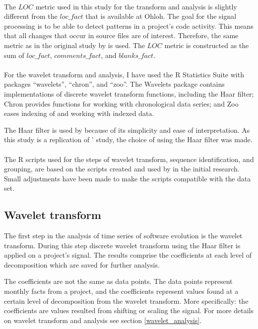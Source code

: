 \paragraph{}
The $LOC$ metric used in this study for the transform and analysis is slightly
different from the $loc\_fact$ that is available at Ohloh. The goal for the
signal processing is to be able to detect patterns in a project's code
activity. This means that all changes that occur in source files are of
interest. Therefore, the same metric as in the original study by
\citet{karus2013} is used. The $LOC$ metric is constructed as the sum of
$loc\_fact$, $comments\_fact$, and $blanks\_fact$.

\paragraph{}
For the wavelet transform and analysis, I have used the R Statistics Suite
with packages ``wavelets'', ``chron'', and ``zoo''. The Wavelets package
contains implementations of discrete wavelet transform functions, including
the Haar filter; Chron provides functions for working with chronological data
series; and Zoo eases indexing of and working with indexed data.

The Haar filter is used by \citet{karus2013} because of its simplicity and ease
of interpretation. As this study is a replication of \citeauthor{karus2013}'
study, the choice of using the Haar filter was made.

\paragraph{}
The R scripts used for the steps of wavelet transform, sequence identification,
and grouping, are based on the scripts created and used by
\citeauthor{karus2013} in the initial research. Small adjustments have been
made to make the scripts compatible with the data set.

\subsection{Wavelet transform}
The first step in the analysis of time series of software evolution is the
wavelet transform. During this step discrete wavelet transform using the Haar
filter is applied on a project's signal. The results comprise the
coefficients at each level of decomposition which are saved for further
analysis.

The coefficients are not the same as data points. The data points represent
monthly facts from a project, and the coefficients represent values found at a
certain level of decomposition from the wavelet transform. More specifically:
the coefficients are values resulted from shifting or scaling the signal. For
more details on wavelet transform and analysis see section
\ref{wavelet_analysis}.


